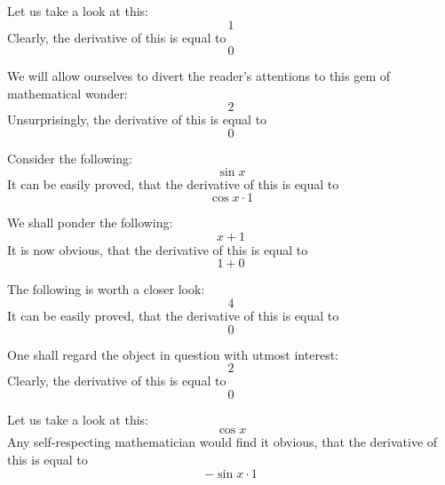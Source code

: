 \documentclass{article}
\begin{document}
Let us take a look at this:
\begin{equation}
1 
\end{equation}
Clearly, the derivative of this is equal to
\begin{equation}
0 
\end{equation}

We will allow ourselves to divert the reader's attentions to this gem of mathematical wonder:
\begin{equation}
2 
\end{equation}
Unsurprisingly, the derivative of this is equal to
\begin{equation}
0 
\end{equation}

Consider the following:
\begin{equation}
\sin x 
\end{equation}
It can be easily proved, that the derivative of this is equal to
\begin{equation}
\cos x \cdot 1 
\end{equation}

We shall ponder the following:
\begin{equation}
x + 1 
\end{equation}
It is now obvious, that the derivative of this is equal to
\begin{equation}
1 + 0 
\end{equation}

The following is worth a closer look:
\begin{equation}
4 
\end{equation}
It can be easily proved, that the derivative of this is equal to
\begin{equation}
0 
\end{equation}

One shall regard the object in question with utmost interest:
\begin{equation}
2 
\end{equation}
Clearly, the derivative of this is equal to
\begin{equation}
0 
\end{equation}

Let us take a look at this:
\begin{equation}
\cos x 
\end{equation}
Any self-respecting mathematician would find it obvious, that the derivative of this is equal to
\begin{equation}
-\sin x \cdot 1 
\end{equation}
\end{document}
